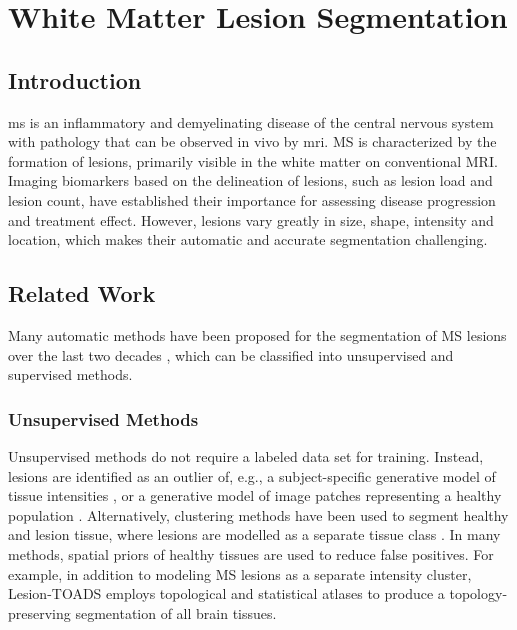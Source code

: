 \chapter{White Matter Lesion Segmentation}
\label{sec:segmentation}

\section{Introduction}

\Gls{ms} is an inflammatory and demyelinating disease of the central nervous
system with pathology that can be observed in vivo by \gls{mri}.
MS is characterized by the formation of lesions, primarily visible in the white
matter on conventional MRI. Imaging biomarkers based on the delineation of
lesions, such as lesion load and lesion count, have established their importance
for assessing disease progression and treatment effect. However, lesions vary
greatly in size, shape, intensity and location, which makes their automatic and
accurate segmentation challenging.

\section[Related work]{Related Work}

Many automatic methods have been proposed for the segmentation of MS
\mbox{lesions} over the last two decades \citep{garcia2013}, which can be
classified into unsupervised and supervised methods.

\subsection[Unsupervised methods]{Unsupervised Methods}

Unsupervised methods do not require a labeled data set for training. Instead,
lesions are identified as an outlier of, e.g., a subject-specific generative
model of tissue intensities
\citep{vanleemput2001,tomas2015,schmidt2012automated,roura2015}, or a generative
model of image patches representing a healthy population \citep{weiss2013}.
Alternatively, clustering methods have been used to segment healthy and lesion
tissue, where lesions are modelled as a separate tissue class
\citep{shiee2010topology,sudre2015}. In many methods, spatial priors of healthy
tissues are used to reduce false positives. For example, in addition to
modeling MS lesions as a separate intensity cluster, Lesion-TOADS
\citep{shiee2010topology} employs topological and statistical atlases to produce
a topology-preserving segmentation of all brain tissues.

